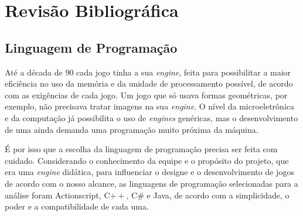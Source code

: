 \chapter{Revisão Bibliográfica}
\label{cap:revisao}
%
\section{Linguagem de Programação}
\label{linguagem}
%
Até a década de 90 cada jogo tinha a sua \textit{engine}, feita para possibilitar a maior eficiência no uso da memória e da unidade de 
processamento possível, de acordo com as exigências de cada jogo. Um jogo que só usava formas geométricas, por exemplo, não precisava 
tratar imagens na sua \textit{engine}. O nível da microeletrônica e da computação já possibilita o uso de \textit{engines} genéricas, 
mas o desenvolvimento de uma ainda demanda uma programação muito próxima da máquina. 
\par
É por isso que a escolha da linguagem de programação precisa ser feita com cuidado. Considerando o conhecimento da equipe e o propósito do 
projeto, que era uma \textit{engine} didática, para influenciar o designe e o desenvolvimento de jogos de acordo com o nosso alcance, as linguagens 
de programação selecionadas para a análise foram Actionscript, C$++$, C\# e Java, de acordo com a simplicidade, o poder e a compatibilidade 
de cada uma.
%
